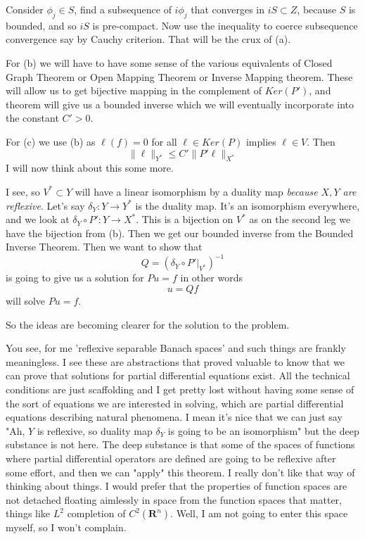 \documentclass{amsart}
\begin{document}
Consider $\phi_j \in S$, find a subsequence of $i\phi_j$ that converges in $iS \subset Z$, because $S$ is bounded, and so $iS$ is pre-compact.  Now use the inequality to coerce subsequence convergence say by Cauchy criterion.  That will be the crux of (a).

For (b) we will have to have some sense of the various equivalents of Closed Graph Theorem or Open Mapping Theorem or Inverse Mapping theorem.  These will allow us to get bijective mapping in the complement of $Ker(P')$, and theorem will give us a bounded inverse which we will eventually incorporate into the constant $C'>0$.

For (c) we use (b) as $\ell(f)=0$ for all $\ell \in Ker(P)$ implies $\ell \in V$.  Then 
\[
\| \ell \|_{Y^*} \le C' \| P'\ell \|_{X^*}
\]
I will now think about this some more.

I see, so $V^* \subset Y$ will have a linear isomorphism by a duality map {\em because $X,Y$ are reflexive}.  Let's say $\delta_Y: Y\rightarrow Y^*$ is the duality map.  It's an isomorphism everywhere, and we look at $\delta_Y \circ P': Y \rightarrow X^*$.  This is a bijection on $V^*$ as on the second leg we have the bijection from (b).  Then we get our bounded inverse from the Bounded Inverse Theorem.  Then we want to show that 
\[
Q = (\delta_Y \circ P'|_{V^*})^{-1}
\]
is going to give us a solution for $Pu = f$ in other words
\[
u = Qf
\]
will solve $Pu=f$.  

So the ideas are becoming clearer for the solution to the problem. 

You see, for me 'reflexive separable Banach spaces' and such things are frankly meaningless.  I see these are abstractions that proved valuable to know that we can prove that solutions for partial differential equations exist.  All the technical conditions are just scaffolding and I get pretty lost without having some sense of the sort of equations we are interested in solving, which are partial differential equations describing natural phenomena.  I mean it's nice that we can just say "Ah, $Y$ is reflexive, so duality map $\delta_Y$ is going to be an isomorphism" but the deep substance is not here.  The deep substance is that some of the spaces of functions where partial differential operators are defined are going to be reflexive after some effort, and then we can "apply" this theorem.  I really don't like that way of thinking about things.  I would prefer that the properties of function spaces are not detached floating aimlessly in space from the function spaces that matter, things like $L^2$ completion of $C^2(\mathbf{R}^n)$.  Well, I am not going to enter this space myself, so I won't complain.
\end{document}
